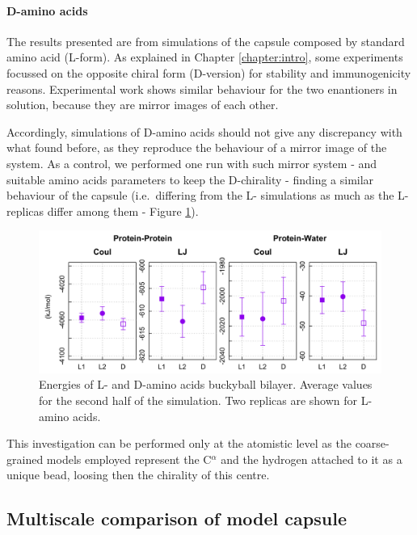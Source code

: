 \paragraph{D-amino acids} The results presented are from simulations of the capsule composed by standard amino acid (L-form). As explained in Chapter \ref{chapter:intro}, some experiments focussed on the opposite chiral form (D-version) for stability and immunogenicity reasons. Experimental work shows similar behaviour for the two enantioners in solution, because they are mirror images of each other.

Accordingly, simulations of D-amino acids should not give any discrepancy with what found before, as they reproduce the behaviour of a mirror image of the system. As a control, we performed one run with such mirror system - and suitable amino acids parameters to keep the D-chirality - finding a similar behaviour of the capsule (i.e.\ differing from the L- simulations as much as the L- replicas differ among them - Figure \ref{fig:D_aa}).

\begin{figure}[t]
\centering
\includegraphics[width=0.95\linewidth]{3results_capsule/pics/compare_D_L.png}
\caption[Energies of L- and D-amino acids buckyball bilayer]{Energies of L- and D-amino acids buckyball bilayer. Average values for the second half of the simulation. Two replicas are shown for L-amino acids.}
\label{fig:D_aa}
\end{figure}

This investigation can be performed only at the atomistic level as the coarse-grained models employed represent the C$^\alpha$ and the hydrogen attached to it as a unique bead, loosing then the chirality of this centre.


\subsection{Multiscale comparison of model capsule} \label{sec:res_multiscale}


